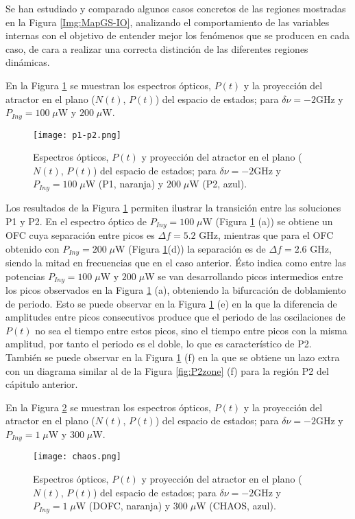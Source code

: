 Se han estudiado y comparado algunos casos concretos de las regiones mostradas en la Figura \ref{Img:MapGS-IO}, analizando el comportamiento de las variables internas con el objetivo de entender mejor los fen\'omenos que se producen en cada caso, de cara a realizar una correcta distinci\'on de las diferentes regiones din\'amicas.

En la Figura \ref{fig:p1-p2} se muestran los espectros \'opticos, $P(t)$ y la proyecci\'on del atractor en el plano ($N(t)$, $P(t)$) del espacio de estados; para $\delta\nu = -2$GHz y $P_{Iny} = 100\;\mu$W y $200\;\mu$W.

	\begin{figure}[H]
		\centering
		\texttt{[image: p1-p2.png]}
		\caption{\label{fig:p1-p2}Espectros \'opticos, $P(t)$ y proyecci\'on del atractor en el plano ($N(t)$, $P(t)$) del espacio de estados; para $\delta\nu = -2$GHz y $P_{Iny} = 100\;\mu$W (P1, naranja) y $200\;\mu$W (P2, azul).}	
	\end{figure}

Los resultados de la Figura \ref{fig:p1-p2} permiten ilustrar la transición entre las soluciones P1 y P2. En el espectro \'optico de $P_{Iny} = 100\;\mu$W (Figura \ref{fig:p1-p2} (a)) se obtiene un OFC cuya separaci\'on entre picos es $\Delta f = 5.2$ GHz, mientras que para el OFC obtenido con $P_{Iny} = 200\;\mu$W (Figura \ref{fig:p1-p2}(d)) la separaci\'on es de $\Delta f = 2.6$ GHz, siendo la mitad en frecuencias que en el caso anterior. \'Esto indica como entre las potencias $P_{Iny} = 100\;\mu$W y $200\;\mu$W se van desarrollando picos intermedios entre los picos observados en la Figura \ref{fig:p1-p2} (a), obteniendo la bifurcación de doblamiento de periodo. Esto se puede observar en la Figura \ref{fig:p1-p2} (e) en la que la diferencia de amplitudes entre picos consecutivos produce que el periodo de las oscilaciones de $P(t)$ no sea el tiempo entre estos picos, sino el tiempo entre picos con la misma amplitud, por tanto el periodo es el doble, lo que es característico de P2. Tambi\'en se puede observar en la Figura \ref{fig:p1-p2} (f) en la que se obtiene un lazo extra con un diagrama similar al de la Figura \ref{fig:P2zone} (f) para la regi\'on P2 del c\'apitulo anterior.

En la Figura \ref{fig:chaos} se muestran los espectros \'opticos, $P(t)$ y la proyecci\'on del atractor en el plano ($N(t)$, $P(t)$) del espacio de estados; para $\delta\nu = -2$GHz y $P_{Iny} = 1\;\mu$W y $300\;\mu$W.

	\begin{figure}[H]
		\centering
		\texttt{[image: chaos.png]}
		\caption{\label{fig:chaos}Espectros \'opticos, $P(t)$ y proyecci\'on del atractor en el plano ($N(t)$, $P(t)$) del espacio de estados; para $\delta\nu = -2$GHz y $P_{Iny} = 1\;\mu$W (DOFC, naranja) y $300\;\mu$W (CHAOS, azul).}	
	\end{figure}

